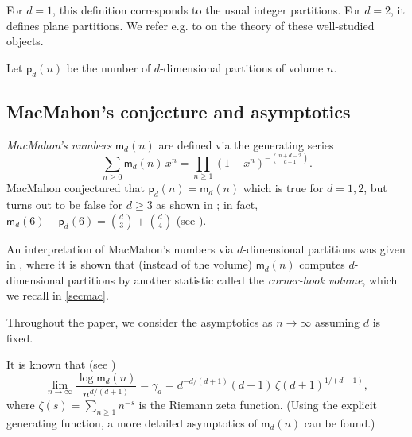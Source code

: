 \documentclass[12pt]{amsart}
\theoremstyle{definition}
\theoremstyle{remark}
\begin{document}
\vspace{0.5em}

For $d = 1$, this definition corresponds to the usual integer partitions. For $d = 2$, it defines %
{plane partitions}. We refer e.g. to \cite{sta2, andrews, sta, krat} on the theory of these well-studied objects.

\vspace{0.5em}

Let $\mathsf{p}_d(n)$ be the number of $d$-dimensional partitions of volume $n$. 

\subsection{MacMahon's conjecture and asymptotics} 
{\it MacMahon's numbers} $\mathsf{m}_d(n)$ are defined via the generating series
$$
\sum_{n \ge 0} \mathsf{m}_d(n)\, x^n = \prod_{n \ge 1} (1 - x^{n})^{-\binom{n + d - 2}{d - 1}}.
$$
MacMahon \cite{macmahon} conjectured that $\mathsf{p}_d(n) = \mathsf{m}_d(n)$ which is true for $d = 1,2$, but turns out to be false for $d \ge 3$ as shown %
in \cite{atkin}; 
in fact, %
$
\mathsf{m}_d(6) - \mathsf{p}_d(6) = \binom{d}{3} + \binom{d}{4}
$
(see \cite{andrews}).


An interpretation of MacMahon's numbers via $d$-dimensional partitions was given in \cite{ay}, where it is shown that (instead of the volume) $\mathsf{m}_d(n)$ computes %
$d$-dimensional partitions by another statistic called the {\it corner-hook volume}, which we recall in  \textsection\ref{secmac}.

\vspace{0.5em}

Throughout the paper, we consider the asymptotics as $n \to \infty$ assuming $d$ is fixed.

It is known that (see \cite{bgp})
$$
\lim_{n \to \infty} \frac{\log \mathsf{m}_d(n)}{n^{d/(d  + 1)}} = \gamma_d = {{d^{-d/(d+1)} (d+1)\, \zeta(d+1)^{1/(d + 1)}}},
$$
where $\zeta(s) = \sum_{n \ge 1} n^{-s}$ is the Riemann zeta function. (Using the explicit generating function, a more detailed asymptotics of $\mathsf{m}_d(n)$ can be found.) 
\end{document}

